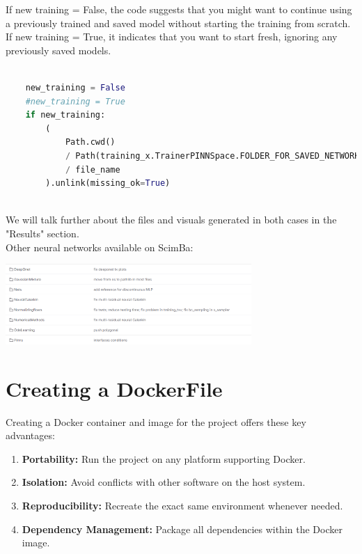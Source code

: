 \documentclass[12pt]{article}
\begin{document}
\begin{enumerate}
\begin{lstlisting}
\end{lstlisting}
\newpage
If new training = False, the code suggests that you might want to continue using a previously trained and saved model without starting the training from scratch.
If new training = True, it indicates that you want to start fresh, ignoring any previously saved models.
\begin{lstlisting}[language=Python,caption={},frame=single, backgroundcolor=\color{gray!10}, basicstyle=\footnotesize,rulecolor=\color{blue}, framexleftmargin=3pt, commentstyle=\color{mygreen}, keywordstyle=\color{blue}]

    new_training = False
    #new_training = True
    if new_training:
        (
            Path.cwd()
            / Path(training_x.TrainerPINNSpace.FOLDER_FOR_SAVED_NETWORKS)
            / file_name
        ).unlink(missing_ok=True)
        
\end{lstlisting}

We will talk further about the files and visuals generated in both cases in the "Results" section.
\\
Other neural networks available on ScimBa:
\begin{frame}{}
    \begin{center}
        \includegraphics[width=0.7\textwidth]{images/ScimBa neural networks.png}
    \end{center}
\end{frame}

\newpage 

\section{Creating a DockerFile}
Creating a Docker container and image for the project offers these key advantages:

\begin{enumerate}
    \item \textbf{Portability:} Run the project on any platform supporting Docker.
    \item \textbf{Isolation:} Avoid conflicts with other software on the host system.
    \item \textbf{Reproducibility:} Recreate the exact same environment whenever needed.
    \item \textbf{Dependency Management:} Package all dependencies within the Docker image.
    \\
\end{enumerate}


\end{enumerate}
\end{document}
